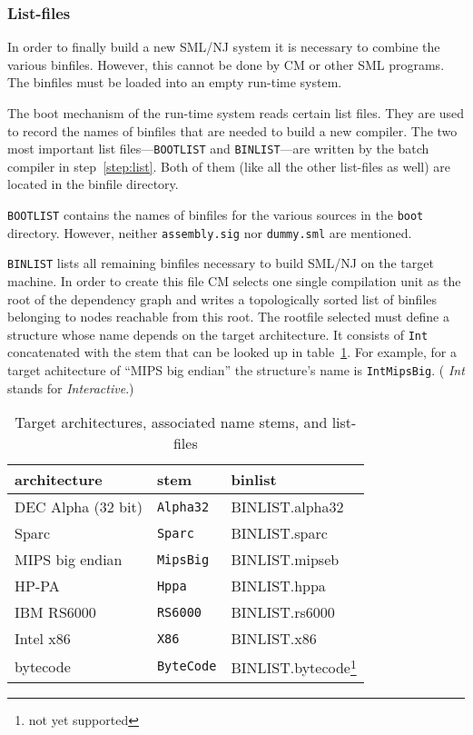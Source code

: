 \documentclass{article}
\begin{document}
\subsubsection{List-files}

In order to finally build a new SML/NJ system it is necessary to
combine the various binfiles.  However, this cannot be done by CM or
other SML programs.  The binfiles must be loaded into an empty
run-time system.

The boot mechanism of the run-time system reads certain list
files.  They are used to record the names of binfiles that are
needed to build a new compiler.  The two most important list
files---{\tt BOOTLIST} and {\tt BINLIST}---are written by the batch
compiler in step~\ref{step:list}.  Both of them (like all the other
list-files as well) are located in the binfile directory.

{\tt BOOTLIST} contains the names of binfiles for the various sources
in the {\tt boot} directory.  However, neither {\tt assembly.sig} nor
{\tt dummy.sml} are mentioned.

{\tt BINLIST} lists all remaining binfiles necessary to build SML/NJ
on the target machine.  In order to create this file CM selects one
single compilation unit as the root of the dependency graph and writes
a topologically sorted list of binfiles belonging to nodes reachable
from this root.  The rootfile selected must define a structure whose
name depends on the target architecture.  It consists of {\tt Int}
concatenated with the stem that can be looked up in
table~\ref{tab:structs}.  For example, for a target achitecture of
``MIPS big endian'' the structure's name is {\tt IntMipsBig}. ({\em
Int} stands for {\em Interactive}.)

\begin{table}
\begin{center}
\begin{tabular}{|lll|}
\hline
architecture & stem & binlist \\
\hline
DEC Alpha (32 bit) & {\tt Alpha32} & BINLIST.alpha32 \\
Sparc & {\tt Sparc} & BINLIST.sparc \\
MIPS {big endian} & {\tt MipsBig} & BINLIST.mipseb \\
HP-PA & {\tt Hppa} & BINLIST.hppa \\
IBM RS6000 & {\tt RS6000 } & BINLIST.rs6000 \\
Intel x86 & {\tt X86} & BINLIST.x86 \\
bytecode & {\tt ByteCode} & BINLIST.bytecode\footnote{not yet supported} \\
\hline
\end{tabular}
\end{center}
\caption{Target architectures, associated name stems, and list-files}
\label{tab:structs}
\end{table}
\end{document}
